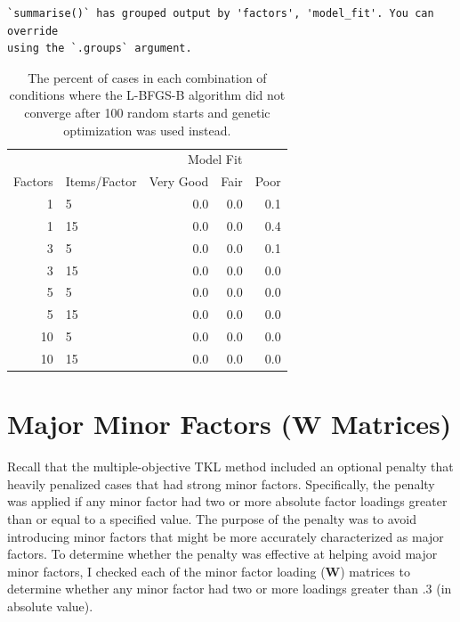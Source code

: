 \documentclass[11pt]{umnthesis}
\begin{document}
\begin{verbatim}
`summarise()` has grouped output by 'factors', 'model_fit'. You can override
using the `.groups` argument.
\end{verbatim}

\begin{table}[tbp]

\begin{center}
\begin{threeparttable}

\caption{\label{tab:tab-l-bfgs-b-convergence}The percent of cases in each combination of conditions where the L-BFGS-B algorithm did not converge after 100 random starts and genetic optimization was used instead.}

\small{

\begin{tabular}{rlrrr}
\toprule
 &  & \multicolumn{3}{c}{Model Fit} \\
\cmidrule(r){3-5}
Factors & Items/Factor & Very Good & Fair & Poor\\
\midrule
1 & 5 & 0.0 & 0.0 & 0.1\\
1 & 15 & 0.0 & 0.0 & 0.4\\
3 & 5 & 0.0 & 0.0 & 0.1\\
3 & 15 & 0.0 & 0.0 & 0.0\\
5 & 5 & 0.0 & 0.0 & 0.0\\
5 & 15 & 0.0 & 0.0 & 0.0\\
10 & 5 & 0.0 & 0.0 & 0.0\\
10 & 15 & 0.0 & 0.0 & 0.0\\
\bottomrule
\end{tabular}

}

\end{threeparttable}
\end{center}

\end{table}

\hypertarget{major-minor-factors-w-matrices}{%
\section{Major Minor Factors (W Matrices)}\label{major-minor-factors-w-matrices}}

Recall that the multiple-objective TKL method included an optional penalty that heavily penalized cases that had strong minor factors. Specifically, the penalty was applied if any minor factor had two or more absolute factor loadings greater than or equal to a specified value. The purpose of the penalty was to avoid introducing minor factors that might be more accurately characterized as major factors. To determine whether the penalty was effective at helping avoid major minor factors, I checked each of the minor factor loading (\(\mathbf{W}\)) matrices to determine whether any minor factor had two or more loadings greater than .3 (in absolute value).
\end{document}
